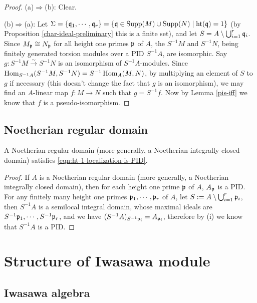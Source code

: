 \begin{proof}
(a)$\Rightarrow$(b): Clear.

(b)$\Rightarrow$(a): Let $\Sigma=\{{\mathfrak{q}}_1,\cdots,{\mathfrak{q}}_r\}
=\{{\mathfrak{q}}\in{\mathrm{Supp}}(M)\cup{\mathrm{Supp}}(N)\mid{\mathrm{ht}}({\mathfrak{q}})=1\}$
(by Proposition \ref{char-ideal-preliminary} this is a finite set),
and let $S=A\setminus\bigcup_{i=1}^r{\mathfrak{q}}_i$.
Since $M_{\mathfrak{p}}\cong N_{\mathfrak{p}}$ for all height one primes ${\mathfrak{p}}$ of $A$,
the $S^{-1}M$ and $S^{-1}N$, being finitely generated torsion modules over
a PID $S^{-1}A$, are isomorphic. Say $g:S^{-1}M\xrightarrow\sim S^{-1}N$
is an isomorphism of $S^{-1}A$-modules.
Since $\operatorname{Hom}_{S^{-1}A}(S^{-1}M,S^{-1}N)=S^{-1}\operatorname{Hom}_A(M,N)$,
by multiplying an element of $S$ to $g$ if necessary
(this doesn't change the fact that $g$ is an isomorphism), we may find
an $A$-linear map $f:M\to N$
such that $g=S^{-1}f$.
Now by Lemma \ref{pis-iff} we know that $f$ is a pseudo-isomorphism.
\end{proof}

\subsection{Noetherian regular domain}

\begin{prop}
\label{regular-domain-is-good}
\leanok
{}
A Noetherian regular domain
(more generally, a Noetherian integrally closed domain)
satisfies \eqref{eqn:ht-1-localization-is-PID}.
\end{prop}

\begin{proof}
If $A$ is a Noetherian regular domain
(more generally, a Noetherian integrally closed domain),
then for each height one prime ${\mathfrak{p}}$ of $A$,
$A_{\mathfrak{p}}$ is a PID.
For any finitely many height one primes ${\mathfrak{p}}_1,\cdots,{\mathfrak{p}}_r$ of $A$,
let $S:=A\setminus\bigcup_{i=1}^r{\mathfrak{p}}_i$,
then $S^{-1}A$ is a semilocal integral domain, whose
maximal ideals are $S^{-1}{\mathfrak{p}}_1,\cdots,S^{-1}{\mathfrak{p}}_r$,
and we have $(S^{-1}A)_{S^{-1}{\mathfrak{p}}_i}=A_{{\mathfrak{p}}_i}$,
therefore by (i) we know that $S^{-1}A$ is a PID.
\end{proof}

\section{Structure of Iwasawa module}

\subsection{Iwasawa algebra}

